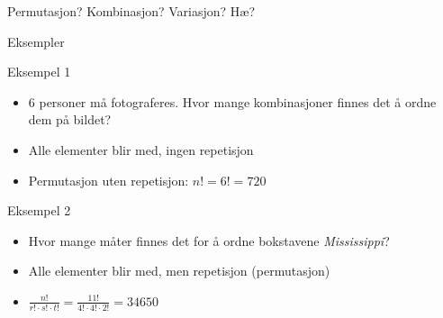 \begin{frame}[fragile]{Permutasjon? Kombinasjon? Variasjon? Hæ?}
\end{frame}


\begin{frame}{Eksempler}
\begin{block}{Eksempel 1}
\begin{itemize}
\item 6 personer må fotograferes. Hvor mange kombinasjoner finnes det å ordne dem på bildet?
\item Alle elementer blir med, ingen repetisjon 
\item Permutasjon uten repetisjon: $n!=6!=720$
\end{itemize}
\end{block}
\pause
\begin{block}{Eksempel 2}
\begin{itemize}
\item Hvor mange måter finnes det for å ordne bokstavene \textit{Mississippi}?
\item Alle elementer blir med, men repetisjon (permutasjon)
\item $\frac{n!}{r!\cdot s!\cdot t!} =  \frac{11!}{4!\cdot 4!\cdot 2!}=34650$
\end{itemize}
\end{block}
\end{frame}


